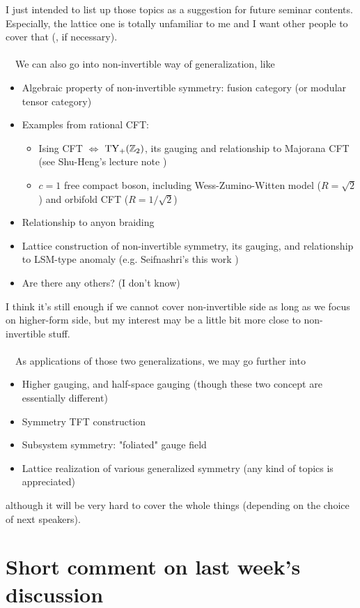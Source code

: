\documentclass{ltjsarticle}
\theoremstyle{mystyle} %
\numberwithin{equation}{section}
\begin{document}
I just intended to list up those topics as a suggestion for future seminar contents. 
Especially, the lattice one is totally unfamiliar to me and I want other people to cover that (, if necessary). \\\\
　We can also go into non-invertible way of generalization, like
\begin{itemize}
    \item Algebraic property of non-invertible symmetry: fusion category (or modular tensor category)
    \item Examples from rational CFT: 
    \begin{itemize}
        \item Ising CFT $\Leftrightarrow$ $\mathrm{TY}_{+}(\mathbb{Z}_2)$, its gauging and relationship to Majorana CFT 
        (see Shu-Heng's lecture note \cite{SHS})
        \item $c=1$ free compact boson, including Wess-Zumino-Witten model ($R=\sqrt{2}$) and orbifold CFT ($R=1/\sqrt{2}$)
    \end{itemize}
    \item Relationship to anyon braiding
    \item Lattice construction of non-invertible symmetry, its gauging, and relationship to LSM-type anomaly
    (e.g. Seifnashri's this work \cite{SS})
    \item Are there any others? (I don't know)
\end{itemize}
I think it's still enough if we cannot cover non-invertible side as long as we focus on higher-form side, 
but my interest may be a little bit more close to non-invertible stuff. \\\\
　As applications of those two generalizations, we may go further into
\begin{itemize}
    \item Higher gauging, and half-space gauging (though these two concept are essentially different)
    \item Symmetry TFT construction 
    \item Subsystem symmetry: "foliated" gauge field
    \item Lattice realization of various generalized symmetry (any kind of topics is appreciated)
\end{itemize}
although it will be very hard to cover the whole things (depending on the choice of next speakers).
%
\newpage
\section{Short comment on last week's discussion}
\end{document}
